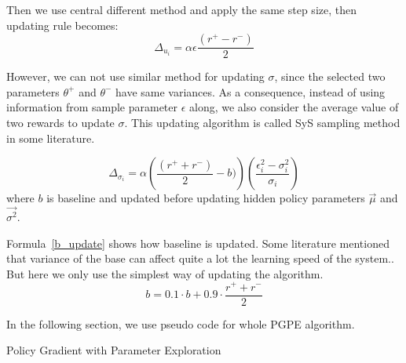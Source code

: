 \documentclass[officiallayout]{tktla}
\begin{document}
Then we use central different method and apply the same step size, then updating rule becomes:
\begin{equation}
\Delta_{u_i} = \alpha \epsilon \frac{(r^+ - r^-)}{2}
\label{sys_update_mu}
\end{equation}

However, we can not use similar method for updating $\sigma$, since the selected two parameters $\theta^+$ and $\theta^-$ have same variances. As a consequence, instead of using information from sample parameter $\epsilon$ along, we also consider the average value of two rewards to update $\sigma$. This updating algorithm is called SyS sampling method in some literature.\cite{sehnke2013efficient}

\begin{equation}
\Delta_{\sigma_i} = \alpha \left(\frac{(r^+ + r^-)}{2} - b) \right)\left(\frac{\epsilon_i^2 - \sigma_i^2}{\sigma_i}\right)
\label{sys_update_sigma}
\end{equation}
where $b$ is baseline and updated before updating hidden policy parameters $\vec{\mu}$ and $\vec{\sigma^2}$.

Formula~\ref{b_update} shows how baseline is updated. Some literature mentioned that variance of the base can affect quite a lot the learning speed of the system.\cite{zhao2011analysis}. But here we only use the simplest way of updating the algorithm.
\begin{equation}
b = 0.1 \cdot b + 0.9 \cdot \frac{r^+ + r^-}{2}
\label{b_update}
\end{equation}


In the following section, we use pseudo code for whole PGPE algorithm.
\newline
\newline
\begin{algorithm}[H]
\caption{Policy Gradient with Parameter Exploration}
 
\label{alg:pepg}
\end{algorithm}
 
\end{document}
